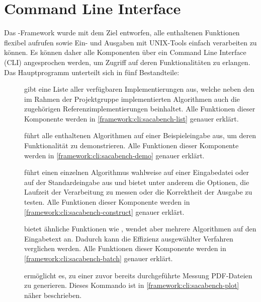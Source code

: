 \section{Command Line Interface}

Das  \sacabench-Framework wurde mit dem Ziel entworfen, alle enthaltenen Funktionen flexibel aufrufen sowie Ein- und Ausgaben mit UNIX-Tools einfach verarbeiten zu können.
Es können daher alle Komponenten über ein Command Line Interface (CLI) angesprochen werden, um Zugriff auf deren Funktionalitäten zu erlangen.
Das Hauptprogramm unterteilt sich in fünf Bestandteile:
\begin{description}
    \item[] gibt eine Liste aller verfügbaren Implementierungen aus, welche neben den im Rahmen der Projektgruppe implementierten Algorithmen auch die zugehörigen Referenzimplementierungen beinhaltet.
        Alle Funktionen dieser Komponente werden in \cref{framework:cli:sacabench-list} genauer erklärt.
    \item[] führt alle enthaltenen Algorithmen auf einer Beispieleingabe aus, um deren Funktionalität zu demonstrieren.
        Alle Funktionen dieser Komponente werden in \cref{framework:cli:sacabench-demo} genauer erklärt.
    \item[] führt einen einzelnen Algorithmus wahlweise auf einer Eingabedatei oder auf der Standardeingabe aus und bietet unter anderem die Optionen, die Laufzeit der Verarbeitung zu messen oder die Korrektheit der Ausgabe zu testen. Alle Funktionen dieser Komponente werden in \cref{framework:cli:sacabench-construct} genauer erklärt.
    \item[] bietet ähnliche Funktionen wie , wendet aber mehrere Algorithmen auf den Eingabetext an. Dadurch kann die Effizienz ausgewählter Verfahren verglichen werden. Alle Funktionen dieser Komponente werden in \cref{framework:cli:sacabench-batch} genauer erklärt.
    \item[] ermöglicht es, zu einer zuvor bereits durchgeführte Messung PDF-Dateien zu generieren. Dieses Kommando ist in \cref{framework:cli:sacabench-plot} näher beschrieben.
\end{description}







